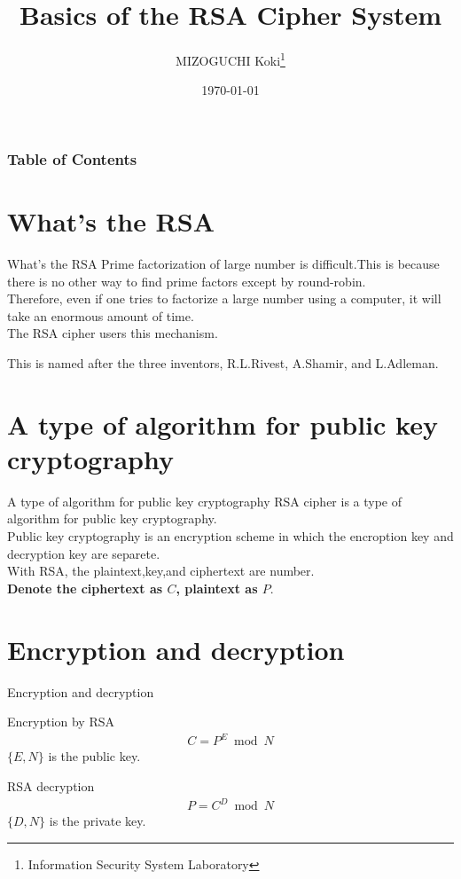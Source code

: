 \documentclass[dvipdfmx]{beamer}
\title[RSA Cipher System]{Basics of the RSA Cipher System}
\author[K.MIZOGUCHI]{MIZOGUCHI Koki\thanks{Information Security System Laboratory}}
\date{\today}
\institute[KUT]{Kochi University of Technology}
\begin{document}
\begin{frame}
\titlepage
\end{frame}

\begin{frame}
\frametitle{Table of Contents}
\tableofcontents
\end{frame}

\section{What's the RSA}
\begin{frame}{What's the RSA}
    Prime factorization of large number is difficult.This is because there is no other way to find prime factors except by round-robin.\\
    Therefore, even if one tries to factorize a large number using a computer, it will take an enormous amount of time.\\
    The RSA cipher users this mechanism.
    \begin{block}{}
        This is named after the three inventors, R.L.Rivest, A.Shamir, and L.Adleman.
    \end{block}
\end{frame}
\section{A type of algorithm for public key cryptography}
\begin{frame}{A type of algorithm for public key cryptography}
    RSA cipher is a type of algorithm for public key cryptography.\\
    Public key cryptography is an encryption scheme in which the encroption key and decryption key are separete.\\
    With RSA, the plaintext,key,and ciphertext are number.\\
    \textbf{Denote the ciphertext as $C$, plaintext as $P$}.
\end{frame}
\section{Encryption and decryption}
\begin{frame}{Encryption and decryption}
    \begin{alertblock}{Encryption by RSA}
        \begin{align}
            C=P^E\bmod N
        \end{align}
        \(\{E,N\}\) is the public key.
    \end{alertblock}
    \begin{alertblock}{RSA decryption}
        \begin{align}
            P=C^D\bmod N
        \end{align}
        \(\{D,N\}\) is the private key.
    \end{alertblock}
\end{frame}
\end{document}
